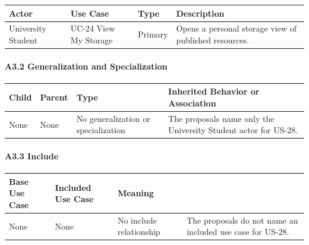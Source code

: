 \documentclass[12pt]{article}
\renewcommand{\baselinestretch}{1.5}
\begin{document}
\begingroup
\small
\renewcommand{\baselinestretch}{1.0}\selectfont
\renewcommand{\arraystretch}{1.15}
\setlength{\tabcolsep}{6pt}
\begin{longtable}{|>{\raggedright\arraybackslash}p{}|>{\raggedright\arraybackslash}p{}|>{\raggedright\arraybackslash}p{}|>{\raggedright\arraybackslash}p{}|}
\hline
\textbf{Actor} & \textbf{Use Case} & \textbf{Type} & \textbf{Description} \\ \hline
\endhead
University Student & UC-24 View My Storage & Primary & Opens a personal storage view of published resources. \\ \hline
\end{longtable}
\endgroup
\par\medskip

\hypertarget{sec:a3-2-generalization-and-specialization}{}
\paragraph*{A3.2 Generalization and Specialization}
\par\medskip

\begingroup
\small
\renewcommand{\baselinestretch}{1.0}\selectfont
\renewcommand{\arraystretch}{1.15}
\setlength{\tabcolsep}{6pt}
\begin{longtable}{|>{\raggedright\arraybackslash}p{}|>{\raggedright\arraybackslash}p{}|>{\raggedright\arraybackslash}p{}|>{\raggedright\arraybackslash}p{}|}
\hline
\textbf{Child} & \textbf{Parent} & \textbf{Type} & \textbf{Inherited Behavior or Association} \\ \hline
\endhead
None & None & No generalization or specialization & The proposals name only the University Student actor for US-28. \\ \hline
\end{longtable}
\endgroup
\par\medskip

\hypertarget{sec:a3-3-include}{}
\paragraph*{A3.3 Include}
\par\medskip

\begingroup
\small
\renewcommand{\baselinestretch}{1.0}\selectfont
\renewcommand{\arraystretch}{1.15}
\setlength{\tabcolsep}{6pt}
\begin{longtable}{|>{\raggedright\arraybackslash}p{}|>{\raggedright\arraybackslash}p{}|>{\raggedright\arraybackslash}p{}|}
\hline
\textbf{Base Use Case} & \textbf{Included Use Case} & \textbf{Meaning} \\ \hline
\endhead
None & None & No include relationship & The proposals do not name an included use case for US-28. \\ \hline
\end{longtable}
\endgroup
\par\medskip
\end{document}
